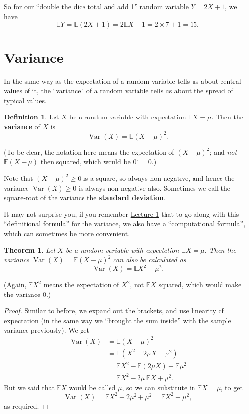 \documentclass[
  a4paper,
]{book}
\newtheorem{theorem}{Theorem}[chapter]
\theoremstyle{definition}
\newtheorem{definition}{Definition}[chapter]
\theoremstyle{definition}
\theoremstyle{definition}
\theoremstyle{definition}
\theoremstyle{remark}
\begin{document}
So for our ``double the dice total and add 1'' random variable \(Y = 2X + 1\), we have
\[ \mathbb EY = \mathbb E(2X+1) = 2\mathbb EX + 1 = 2\times 7 + 1 = 15. \]

\hypertarget{variance}{%
\section{Variance}\label{variance}}

In the same way as the expectation of a random variable tells us about central values of it, the ``variance'' of a random variable tells us about the spread of typical values.

\begin{definition}
Let \(X\) be a random variable with expectation \(\mathbb EX = \mu\). Then the \textbf{variance} of \(X\) is
\[ \operatorname{Var}(X) = \mathbb E(X - \mu)^2 . \]
\end{definition}

(To be clear, the notation here means the expectation of \((X-\mu)^2\); and \emph{not} \(\mathbb E(X - \mu)\) then squared, which would be \(0^2 = 0\).)

Note that \((X - \mu)^2 \geq 0\) is a square, so always non-negative, and hence the variance \(\operatorname{Var}(X) \geq 0\) is always non-negative also. Sometimes we call the square-root of the variance the \textbf{standard deviation}.

It may not surprise you, if you remember \protect\hyperlink{L01-stats}{Lecture 1} that to go along with this ``definitional formula'' for the variance, we also have a ``computational formula'', which can sometimes be more convenient.

\begin{theorem}
Let \(X\) be a random variable with expectation \(\mathbb EX = \mu\). Then the variance \(\operatorname{Var}(X) = \mathbb E(X - \mu)^2\) can also be calculated as
\[ \operatorname{Var}(X) = \mathbb EX^2 - \mu^2 . \]
\end{theorem}

(Again, \(\mathbb EX^2\) means the expectation of \(X^2\), not \(\mathbb EX\) squared, which would make the variance 0.)

\begin{proof}
Similar to before, we expand out the brackets, and use linearity of expectation (in the same way we ``brought the sum inside'' with the sample variance previously). We get
\begin{align*}
  \operatorname{Var}(X) &= \mathbb E(X - \mu)^2 \\
    &= \mathbb E(X^2 - 2\mu X + \mu^2) \\
    &= \mathbb EX^2 - \mathbb E(2\mu X) + \mathbb E \mu^2 \\
    &= \mathbb EX^2 - 2\mu \,\mathbb EX + \mu^2 .
\end{align*}
But we said that \(\mathbb EX\) would be called \(\mu\), so we can substitute in \(\mathbb EX = \mu\), to get
\[ \operatorname{Var}(X) = \mathbb E X^2 - 2\mu^2 + \mu^2 = \mathbb E X^2 - \mu^2 , \]
as required.
\end{proof}
\end{document}
